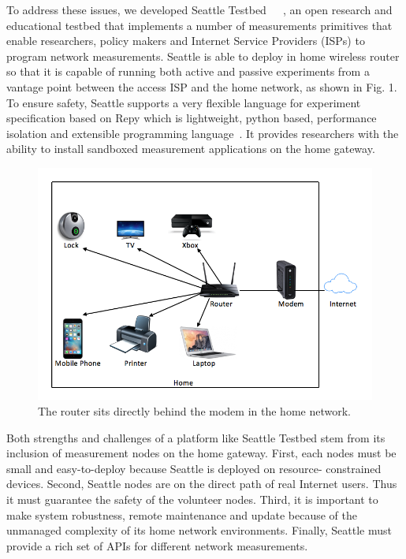 To address these issues, we developed Seattle Testbed~\cite{seattle}~\cite{zhuang2013experience}~\cite{cappos2009seattle}, an open research and educational testbed that implements a number of measurements primitives that enable researchers, policy makers and Internet Service Providers (ISPs) to program network measurements. Seattle is able to deploy in home wireless router so that it is capable of running both active and passive experiments from a vantage point between the access ISP and the home network, as shown in Fig. 1. To ensure safety, Seattle supports a very flexible language for experiment specification based on Repy which is lightweight, python based, performance isolation and extensible programming language~\cite{cappos2010retaining}. It provides researchers with the ability to install sandboxed measurement applications on the home gateway. 

\begin{figure}%
\centering
\includegraphics[width=0.5\columnwidth]{figure/home-network.jpg}
\caption{The router sits directly behind the modem in the home network.}
\label{figure:design}
\end{figure}

Both strengths and challenges of a platform like Seattle Testbed stem from 
its inclusion of measurement nodes on the home gateway. First, each nodes 
must be small and easy-to-deploy because Seattle is deployed on resource-
constrained devices. Second, Seattle nodes are on the direct path of real 
Internet users. Thus it must guarantee the safety of the volunteer nodes. 
Third, it is important to make system robustness, remote maintenance and 
update because of the unmanaged complexity of its home network environments. 
Finally, Seattle must provide a rich set of APIs for different network 
measurements.

